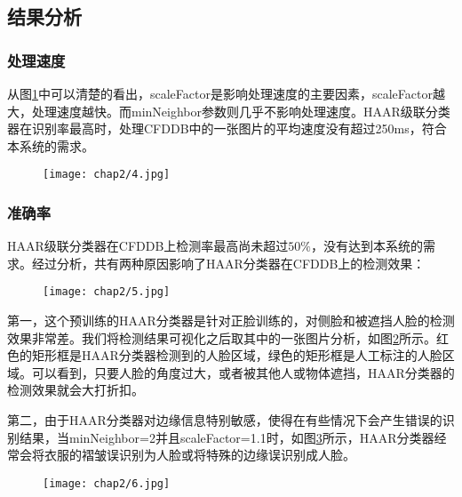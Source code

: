 \subsection{结果分析}

\subsubsection{处理速度}

从图\ref{fig:haartest:speed}中可以清楚的看出，scaleFactor是影响处理速度的主要因素，scaleFactor越大，处理速度越快。而minNeighbor参数则几乎不影响处理速度。HAAR级联分类器在识别率最高时，处理CFDDB中的一张图片的平均速度没有超过250ms，符合本系统的需求。

\begin{figure}[!htp]
	\centering
	\texttt{[image: chap2/4.jpg]}
	\label{fig:haartest:speed}
\end{figure}

\subsubsection{准确率}

HAAR级联分类器在CFDDB上检测率最高尚未超过$50\%$，没有达到本系统的需求。经过分析，共有两种原因影响了HAAR分类器在CFDDB上的检测效果：

\begin{figure}[!htp]
	\centering
	\texttt{[image: chap2/5.jpg]}
	\label{fig:haartest:acc}
\end{figure}

第一，这个预训练的HAAR分类器是针对正脸训练的，对侧脸和被遮挡人脸的检测效果非常差。我们将检测结果可视化之后取其中的一张图片分析，如图\ref{fig:haartest:acc}所示。红色的矩形框是HAAR分类器检测到的人脸区域，绿色的矩形框是人工标注的人脸区域。可以看到，只要人脸的角度过大，或者被其他人或物体遮挡，HAAR分类器的检测效果就会大打折扣。

第二，由于HAAR分类器对边缘信息特别敏感，使得在有些情况下会产生错误的识别结果，当minNeighbor=2并且scaleFactor=1.1时，如图\ref{fig:haartest:acc2}所示，HAAR分类器经常会将衣服的褶皱误识别为人脸或将特殊的边缘误识别成人脸。

\begin{figure}[!htp]
	\centering
	\texttt{[image: chap2/6.jpg]}
	\label{fig:haartest:acc2}
\end{figure}

